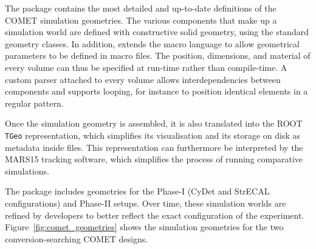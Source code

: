 The \SimG package contains the most detailed and up-to-date definitions of the
COMET simulation geometries. The various components that make up a simulation
world are defined with constructive solid geometry, using the standard \Geant
geometry classes. In addition, \SimG extends the \Geant macro language to allow
geometrical parameters to be defined in macro files. The position, dimensions,
and material of every volume can thus be specified at run-time rather than
compile-time. A custom parser attached to every volume allows interdependencies
between components and supports looping, for instance to position identical
elements in a regular pattern.

Once the simulation geometry is assembled, it is also translated into the ROOT
\texttt{TGeo} representation, which simplifies its visualisation and its storage
on disk as metadata inside \oaEvent files. This representation can furthermore
be interpreted by the MARS15 tracking software, which simplifies the process of
running comparative simulations.


The \SimG package includes geometries for the Phase-I (CyDet and StrECAL
configurations) and Phase-II setups. Over time, these simulation worlds are
refined by developers to better reflect the exact configuration of the
experiment. Figure~\ref{fig:comet_geometries} shows the simulation geometries
for the two conversion-searching COMET designs.




